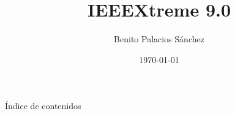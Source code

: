 \documentclass[usenames,dvipsnames]{beamer}
\title{IEEEXtreme 9.0}
\date[Septiembre de 2015]{\today}
\author{Benito Palacios Sánchez}
\institute[IEEE SB UGR]{IEEE Student Branch of Granada}
\begin{document}
\begin{frame}[plain]
    \titlepage
\end{frame}

\begin{frame}{Índice de contenidos}
    \tableofcontents
\end{frame}
\end{document}
